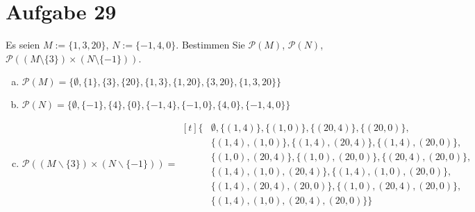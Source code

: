 \section{Aufgabe 29}
\setcounter{section}{29}

Es seien $M := \{1, 3, 20\}$, $N := \{-1, 4, 0\}$. Bestimmen Sie
$\mathcal{P}(M)$, $\mathcal{P}(N)$, $\mathcal{P}((M \setminus \{3\}) \times (N
\setminus \{-1\}))$.

\begin{enumerate}[(a)]
    \item $\mathcal{P}(M) = \{\emptyset, \{1\}, \{3\}, \{20\}, \{1, 3\},
        \{1, 20\}, \{3, 20\}, \{1, 3, 20\}\}$
    \item $\mathcal{P}(N) = \{\emptyset, \{-1\}, \{4\}, \{0\}, \{-1, 4\},
        \{-1, 0\}, \{4, 0\}, \{-1, 4, 0\}\}$
    \item $\mathcal{P}((M \backslash\{3\}) \times(N \backslash\{-1\})) =
        \begin{aligned}[t]
            \{&\emptyset,\{(1,4)\},\{(1,0)\},\{(20,4)\},\{(20,0)\},\\
              &\{(1,4),(1,0)\},\{(1,4),(20,4)\}, \{(1,4),(20,0)\}, \\
              &\{(1,0),(20,4)\},\{(1,0),(20,0)\},\{(20,4),(20,0)\}, \\
              &\{(1,4),(1,0),(20,4)\},\{(1,4),(1,0),(20,0)\}, \\
              &\{(1,4),(20,4),(20,0)\},\{(1,0),(20,4),(20,0)\}, \\
              &\{(1,4),(1,0),(20,4),(20,0)\}\}
            \end{aligned}$
\end{enumerate}
